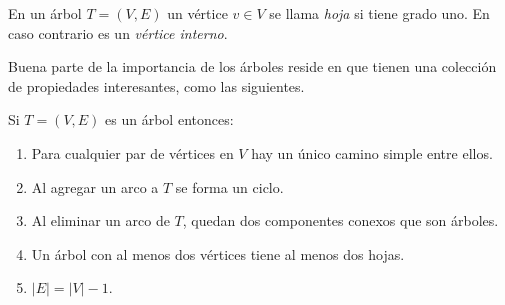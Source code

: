   \begin{definition}
    En un árbol \(T = (V, E)\)
    un vértice \(v \in V\) se llama \emph{hoja}
    si tiene grado uno.
    En caso contrario es un \emph{vértice interno}.
  \end{definition}

  Buena parte de la importancia de los árboles
  reside en que tienen una colección de propiedades interesantes,
  como las siguientes.
  \begin{theorem}
    \label{theo:arbol-propiedades}
    Si \(T = (V, E)\) es un árbol entonces:
    \begin{enumerate}[label=\textbf{T\arabic{*}:},
		      ref=T\arabic{*},
		      resume]
      \item
	\label{T:unico-camino}
	Para cualquier par de vértices en \(V\)
	hay un único camino simple entre ellos.
      \item
	\label{T:nuevo-arco}
	Al agregar un arco a \(T\) se forma un ciclo.
      \item
	\label{T:quitar-arco}
	Al eliminar un arco de \(T\),
	quedan dos componentes conexos que son árboles.
      \item
	\label{T:hojas}
	Un árbol con al menos dos vértices tiene al menos dos hojas.
      \item
	\label{T:vertices-arcos}
	\(\lvert E \rvert = \lvert V \rvert - 1\).
    \end{enumerate}
  \end{theorem}
